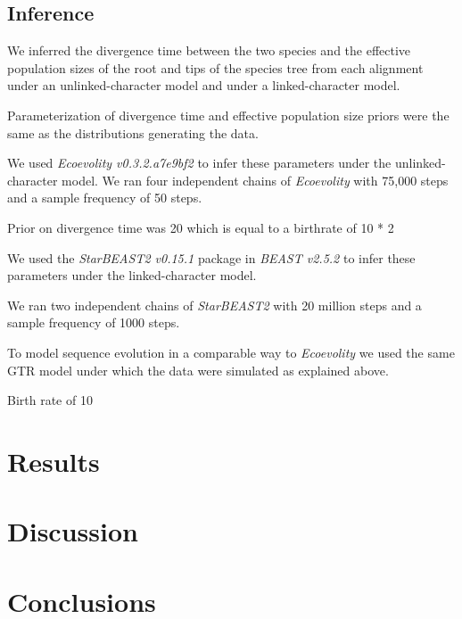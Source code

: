 \subsection{Inference}
We inferred the divergence time between the two species and the effective population sizes of the root and tips of the species tree from each alignment under an unlinked-character model and under a linked-character model.

Parameterization of divergence time and effective population size priors were the same as the distributions generating the data.

We used \textit{Ecoevolity v0.3.2.a7e9bf2} to infer these parameters under the unlinked-character model. We ran four independent chains of \textit{Ecoevolity} with 75,000 steps and a sample frequency of 50 steps.

Prior on divergence time was 20 which is equal to a birthrate of 10 * 2

We used the \textit{StarBEAST2 v0.15.1} package in \textit{BEAST v2.5.2} to infer these parameters under the linked-character model. 

We ran two independent chains of \textit{StarBEAST2} with 20 million steps and a sample frequency of 1000 steps. 

To model sequence evolution in a comparable way to \textit{Ecoevolity} we used the same GTR model under which the data were simulated as explained above.

Birth rate of 10

\section{Results}














\section{Discussion}


\section{Conclusions}
